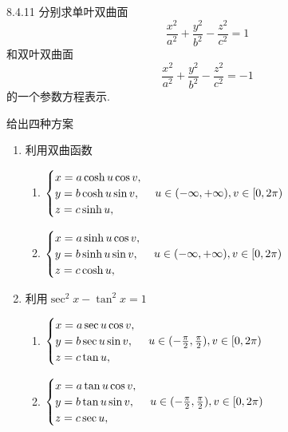 \begin{exercise}{8.4.11}
    分别求单叶双曲面$$\frac{x^2}{a^2}+\frac{y^2}{b^2}-\frac{z^2}{c^2}=1$$和双叶双曲面$$\frac{x^2}{a^2}+\frac{y^2}{b^2}-\frac{z^2}{c^2}=-1$$的一个参数方程表示.
\end{exercise}
\begin{solution}
    给出四种方案
    \begin{enumerate}
        \item 利用双曲函数
        \begin{multicols}{2}
              \begin{enumerate}
            \item[单叶] 
            $\begin{cases}
                x=a\cosh u\cos v,\\
                y=b\cosh u\sin v,\\
                z=c\sinh u,\\
            \end{cases}\\u\in(-\infty,+\infty),v\in[0,2\pi)$
            \item[双叶] 
            $\begin{cases}
                x=a\sinh u\cos v,\\
                y=b\sinh u\sin v,\\
                z=c\cosh u,\\
            \end{cases}\\u\in(-\infty,+\infty),v\in[0,2\pi)$
        \end{enumerate}
        \end{multicols}

        \item 利用$\sec^2x-\tan^2x=1$
        \begin{multicols}{2}
              \begin{enumerate}
            \item[单叶] 
            $\begin{cases}
                x=a\sec u\cos v,\\
                y=b\sec u\sin v,\\
                z=c\tan u,\\
            \end{cases}\\u\in(-\frac{\pi}{2},\frac{\pi}{2}),v\in[0,2\pi)$
            \item[双叶] 
            $\begin{cases}
                x=a\tan u\cos v,\\
                y=b\tan u\sin v,\\
                z=c\sec u,\\
            \end{cases}\\u\in(-\frac{\pi}{2},\frac{\pi}{2}),v\in[0,2\pi)$
        \end{enumerate}
        \end{multicols}


\end{enumerate}
\end{solution}
